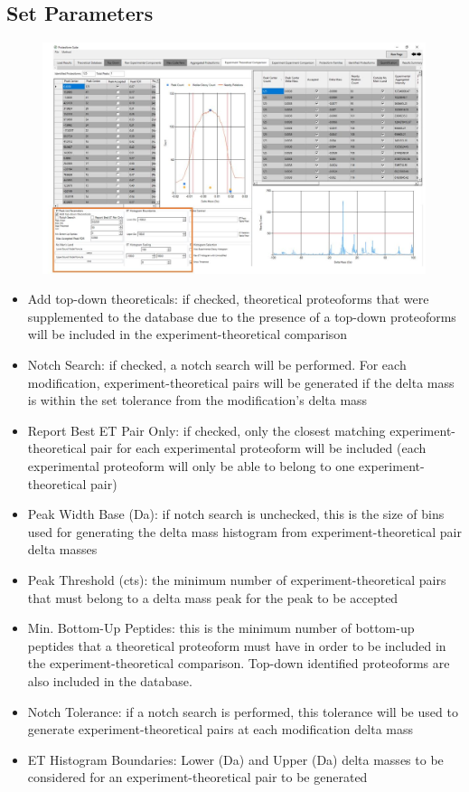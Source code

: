 \subsection{Set Parameters}
\begin{figure}[h]
\centering
\includegraphics[scale=0.43]{figures/et1.jpg}
\end{figure}
\begin{itemize}
\item Add top-down theoreticals: if checked, theoretical proteoforms that were supplemented to the database due to the presence of a top-down proteoforms will be included in the experiment-theoretical comparison
\item Notch Search: if checked, a notch search will be performed. For each modification, experiment-theoretical pairs will be generated if the delta mass is within the set tolerance from the modification's delta mass
\item Report Best ET Pair Only: if checked, only the closest matching experiment-theoretical pair for each experimental proteoform will be included (each experimental proteoform will only be able to belong to one experiment-theoretical pair)
\item Peak Width Base (Da): if notch search is unchecked, this is the size of bins used for generating the delta mass histogram from experiment-theoretical pair delta masses
\item Peak Threshold (cts): the minimum number of experiment-theoretical pairs that must belong to a delta mass peak for the peak to be accepted
\item Min. Bottom-Up Peptides: this is the minimum number of bottom-up peptides that a theoretical proteoform must have in order to be included in the experiment-theoretical comparison. Top-down identified proteoforms are also included in the database.
\item Notch Tolerance: if a notch search is performed, this tolerance will be used to generate experiment-theoretical pairs at each modification delta mass
\item ET Histogram Boundaries: Lower (Da) and Upper (Da) delta masses to be considered for an experiment-theoretical pair to be generated 
\end{itemize}

